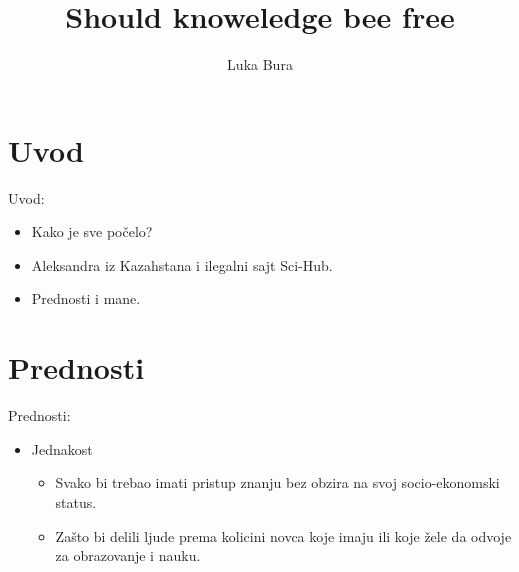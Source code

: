 \documentclass[aspectratio=1610,17pt,utf8]{beamer}
\title[Shorter Title]{Should knoweledge bee free}
\author[Shorter Author]{Luka Bura}
\institute[Matematicki fakultet]
{
	{Matematicki fakultet}
}
\begin{document}
	
	\begin{frame}[plain]
		\titlepage
	\end{frame}
	
	\begin{frame}[plain]
		\tableofcontents
	\end{frame}
	
	
	\section{Uvod}
	
	\begin{frame}{Uvod:}
		
		\begin{itemize}
			\item Kako je sve počelo?
			\item Aleksandra iz Kazahstana i ilegalni sajt Sci-Hub.
			\item Prednosti i mane.
		\end{itemize}
	\end{frame}
	
	
	\section{Prednosti}
	
	
	\begin{frame}{Prednosti:}
		
		\begin{itemize}
			\item Jednakost
			\begin{itemize}
				\item Svako bi trebao imati pristup znanju bez obzira na svoj socio-ekonomski status.
				\item Zašto bi delili ljude prema kolicini novca koje imaju ili koje žele da odvoje za obrazovanje i nauku.
			\end{itemize}
		\end{itemize}
	\end{frame}
	
	
\end{document}

